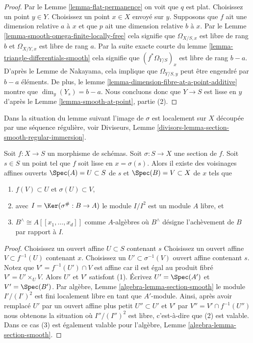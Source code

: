\begin{proof}
Par le Lemme \ref{lemma-flat-permanence} on voit que $q$ est plat. Choisissez
un point $y \in Y$. Choisissez un point $x \in X$ envoyé
sur $y$. Supposons que $f$ ait une dimension relative
$a$ à $x$ et que $p$ ait une dimension relative $b$
à $x$. Par le Lemme \ref{lemma-smooth-omega-finite-locally-free} cela signifie que $\Omega_{X/S, x}$
est libre de rang $b$ et $\Omega_{X/Y, x}$ est
libre de rang $a$. Par la suite exacte courte
du lemme \ref{lemma-triangle-differentials-smooth} cela signifie que $(f^*\Omega_{Y/S})_x$
est libre de rang $b - a$. D'après le Lemme de
Nakayama, cela implique que $\Omega_{Y/S, y}$ peut être engendré
par $b - a$ éléments. De plus, le lemme \ref{lemma-dimension-fibre-at-a-point-additive} montre
que $\dim_y(Y_s) = b - a$. Nous concluons donc que
$Y \to S$ est lisse en $y$ d'après le Lemme \ref{lemma-smooth-at-point}, partie (2).
\end{proof}

\noindent
Dans la situation du lemme suivant l'image de $\sigma$
est localement sur $X$ découpée par
une séquence régulière, voir Diviseurs, Lemme \ref{divisors-lemma-section-smooth-regular-immersion}.

\begin{lemma}
\label{lemma-section-smooth-morphism}
Soit $f : X \to S$ un morphisme de schémas. Soit
$\sigma : S \to X$ une section de $f$.
Soit $s \in S$ un point tel que $f$ soit lisse en $x = \sigma(s)$.
Alors il existe des voisinages affines
ouverts $\Spec(A) = U \subset S$ de $s$ et $\Spec(B) = V \subset X$ de $x$
tels que
\begin{enumerate}
\item $f(V) \subset U$ et $\sigma(U) \subset V$,
\item avec $I = \Ker(\sigma^\# : B \to A)$ le module $I/I^2$ est un module
$A$ libre, et
\item $B^\wedge \cong A[[x_1, \ldots, x_d]]$ comme $A$-algèbres où $B^\wedge$ désigne
l'achèvement de $B$ par rapport à $I$.
\end{enumerate}
\end{lemma}

\begin{proof}
Choisissez un ouvert affine $U \subset S$ contenant
$s$ Choisissez un ouvert affine $V \subset f^{-1}(U)$ contenant
$x$. Choisissez un $U' \subset \sigma^{-1}(V)$ ouvert affine contenant
$s$. Notez que $V' = f^{-1}(U') \cap V$ est affine car il est égal au produit
fibré $V' = U' \times_U V$. Alors $U'$ et $V'$ satisfont (1).
Écrivez $U' = \Spec(A')$ et $V' = \Spec(B')$. Par algèbre,
Lemme \ref{algebra-lemma-section-smooth} le module $I'/(I')^2$ est fini
localement libre en tant que $A'$-module. Ainsi, après
avoir remplacé $U'$ par un ouvert affine plus petit $U'' \subset U'$
et $V'$ par $V'' = V' \cap f^{-1}(U'')$ nous obtenons la situation où $I''/(I'')^2$
est libre, c'est-à-dire que (2) est valable. Dans ce cas (3) est également
valable pour l'algèbre, Lemme \ref{algebra-lemma-section-smooth}.
\end{proof}

